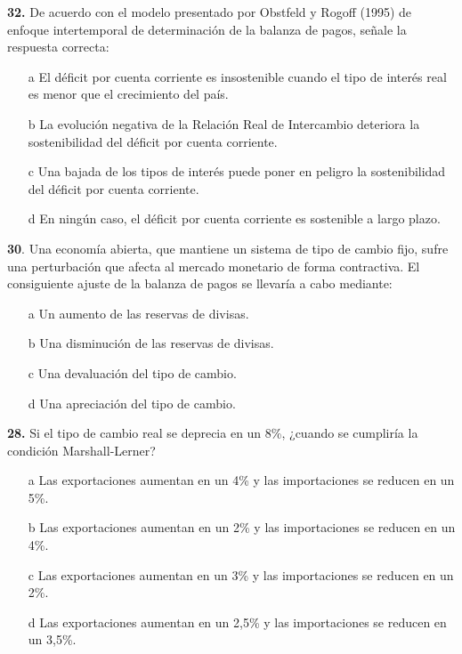 \documentclass{nuevotema}
\begin{document}
\textbf{32.} De acuerdo con el modelo presentado por Obstfeld y Rogoff (1995) de enfoque intertemporal de determinación de la balanza de pagos, señale la respuesta correcta:

\begin{itemize}
	\item[a] El déficit por cuenta corriente es insostenible cuando el tipo de interés real es menor que el crecimiento del país.
	\item[b] La evolución negativa de la Relación Real de Intercambio deteriora la sostenibilidad del déficit por cuenta corriente.
	\item[c] Una bajada de los tipos de interés puede poner en peligro la sostenibilidad del déficit por cuenta corriente.
	\item[d] En ningún caso, el déficit por cuenta corriente es sostenible a largo plazo.
\end{itemize}



\textbf{30}. Una economía abierta, que mantiene un sistema de tipo de cambio fijo, sufre una perturbación que afecta al mercado monetario de forma contractiva. El consiguiente ajuste de la balanza de pagos se llevaría a cabo mediante:
\begin{enumerate}
	\item[a] Un aumento de las reservas de divisas.
	\item[b] Una disminución de las reservas de divisas.
	\item[c] Una devaluación del tipo de cambio.
	\item[d] Una apreciación del tipo de cambio.
\end{enumerate}

\textbf{28.} Si el tipo de cambio real se deprecia en un 8\%, ¿cuando se cumpliría la condición Marshall-Lerner?

\begin{itemize}
	\item[a] Las exportaciones aumentan en un 4\% y las importaciones se reducen en un 5\%.
	\item[b] Las exportaciones aumentan en un 2\% y las importaciones se reducen en un 4\%.
	\item[c] Las exportaciones aumentan en un 3\% y las importaciones se reducen en un 2\%.
	\item[d] Las exportaciones aumentan en un 2,5\% y las importaciones se reducen en un 3,5\%.
\end{itemize}
\end{document}
